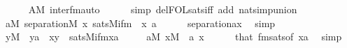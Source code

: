 \begin{isabellebody}
\ \ \ \ \isamarkupfalse%
\ {\isacartoucheopen}A{\isasymin}M{\isacartoucheclose}\ inter{\isacharunderscore}{\kern0pt}fm{\isacharunderscore}{\kern0pt}auto\isanewline
\ \ \ \ \isamarkupfalse%
\ {\isacharparenleft}{\kern0pt}simp\ del{\isacharcolon}{\kern0pt}FOL{\isacharunderscore}{\kern0pt}sats{\isacharunderscore}{\kern0pt}iff\ add{\isacharcolon}{\kern0pt}\ nat{\isacharunderscore}{\kern0pt}simp{\isacharunderscore}{\kern0pt}union{\isacharparenright}{\kern0pt}\isanewline
\ \ \isamarkupfalse%
\isanewline
\ \ \isamarkupfalse%
\ {\isachardoublequoteopen}{\isasymforall}a{\isasymin}M{\isachardot}{\kern0pt}\ separation{\isacharparenleft}{\kern0pt}{\isacharhash}{\kern0pt}{\isacharhash}{\kern0pt}M{\isacharcomma}{\kern0pt}\ {\isasymlambda}x{\isachardot}{\kern0pt}\ sats{\isacharparenleft}{\kern0pt}M{\isacharcomma}{\kern0pt}ifm{\isacharparenleft}{\kern0pt}{}{\isacharcomma}{\kern0pt}{}{\isacharparenright}{\kern0pt}\ {\isacharcomma}{\kern0pt}\ {\isacharbrackleft}{\kern0pt}x{\isacharcomma}{\kern0pt}\ a{\isacharbrackright}{\kern0pt}{\isacharparenright}{\kern0pt}{\isacharparenright}{\kern0pt}{\isachardoublequoteclose}\isanewline
\ \ \ \ \isamarkupfalse%
\ separation{\isacharunderscore}{\kern0pt}ax\ \isamarkupfalse%
\ simp\isanewline
\ \ \isamarkupfalse%
\isanewline
\ \ \isamarkupfalse%
\ {\isachardoublequoteopen}{\isacharparenleft}{\kern0pt}{\isasymforall}y{\isasymin}M\ {\isachardot}{\kern0pt}\ y{\isasymin}a\ {\isasymlongrightarrow}\ x{\isasymin}y{\isacharparenright}{\kern0pt}\ {\isasymlongleftrightarrow}\ sats{\isacharparenleft}{\kern0pt}M{\isacharcomma}{\kern0pt}ifm{\isacharparenleft}{\kern0pt}{}{\isacharcomma}{\kern0pt}{}{\isacharparenright}{\kern0pt}{\isacharcomma}{\kern0pt}{\isacharbrackleft}{\kern0pt}x{\isacharcomma}{\kern0pt}a{\isacharbrackright}{\kern0pt}{\isacharparenright}{\kern0pt}{\isachardoublequoteclose}\isanewline
\ \ \ \ \ {\isachardoublequoteopen}a{\isasymin}M{\isachardoublequoteclose}\ {\isachardoublequoteopen}x{\isasymin}M{\isachardoublequoteclose}\ \ a\ x\isanewline
\ \ \ \ \isamarkupfalse%
\ that\ fmsats{\isacharbrackleft}{\kern0pt}of\ {\isachardoublequoteopen}{\isacharbrackleft}{\kern0pt}x{\isacharcomma}{\kern0pt}a{\isacharbrackright}{\kern0pt}{\isachardoublequoteclose}{\isacharbrackright}{\kern0pt}\ \isamarkupfalse%
\ simp\isanewline
\ \ \isamarkupfalse%
\isanewline
\ \ \isamarkupfalse%

\end{isabellebody}
